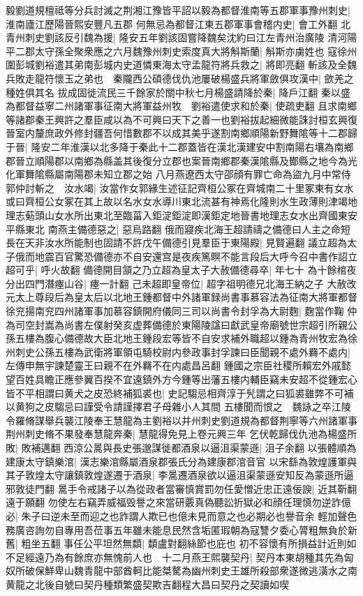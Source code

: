 毅劉道規檀祗等分兵討滅之荆湘江豫皆平詔以毅為都督淮南等五郡軍事豫州刺史|{
	淮南廬江歷陽晉熙安豐凡五郡}
何無忌為都督江東五郡軍事會稽内史|{
	會工外翻}
北青州刺史劉該反引魏為援|{
	隆安五年劉該固嘗降魏矣沈約曰江左青州治廣陵}
清河陽平二郡太守孫全聚衆應之六月魏豫州刺史索度真大將斛斯蘭|{
	斛斯亦虜姓也}
寇徐州圍彭城劉裕遣其弟南彭城内史道憐東海太守孟龍符將兵救之|{
	將即亮翻}
斬該及全魏兵敗走龍符懷玉之弟也　秦隴西公碩德伐仇池屢破楊盛兵將軍斂俱攻漢中|{
	歛羌之種姓俱其名}
拔成固徙流民三千餘家於關中秋七月楊盛請降於秦|{
	降戶江翻}
秦以盛為都督益寧二州諸軍事征南大將軍益州牧　劉裕遣使求和於秦|{
	使疏吏翻}
且求南鄉等諸郡秦王興許之羣臣咸以為不可興曰天下之善一也劉裕拔起細微能誅討桓玄興復晉室内釐庶政外修封疆吾何惜數郡不以成其美乎遂割南鄉順陽新野舞隂等十二郡歸于晉|{
	隆安二年淮漢以北多降于秦此十二郡蓋皆在漢北漢建安中割南陽右壤為南鄉郡晉立順陽郡以南鄉為縣盖其後復分立郡也案晉南鄉郡秦漢隂縣及鄼縣之地今為光化軍舞隂縣屬南陽郡未知立郡之始}
八月燕遼西太守邵顔有罪亡命為盜九月中常侍郭仲討斬之　汝水竭|{
	汝當作女郭緣生述征記齊桓公冢在齊城南二十里冢東有女水或曰齊桓公女冢在其上故以名水女水導川東北流甚有神焉化隆則水生政薄則津竭地理志葂頭山女水所出東北至臨菑入鉅淀鉅淀即漢鉅定地晉書地理志女水出齊國東安平縣東北}
南燕主備德惡之|{
	惡烏路翻}
俄而寢疾北海王超請禱之備德曰人主之命短長在天非汝水所能制也固請不許戊午備德引見羣臣于東陽殿|{
	見賢遍翻}
議立超為太子俄而地震百官驚恐備德亦不自安還宫是夜疾篤瞑不能言段后大呼今召中書作詔立超可乎|{
	呼火故翻}
備德開目頷之乃立超為皇太子大赦備德尋卒|{
	年七十}
為十餘棺夜分出四門潛瘞山谷|{
	瘞一計翻}
己未超即皇帝位|{
	超字祖明德兄北海王納之子}
大赦改元太上尊段后為皇太后以北地王鍾都督中外諸軍録尚書事慕容法為征南大將軍都督徐兖揚南兖四州諸軍事加慕容鎮開府儀同三司以尚書令封孚為大尉麴|{
	麴當作鞠}
仲為司空封嵩為尚書左僕射癸亥虚葬備德於東陽陵諡曰獻武皇帝廟號世宗超引所親公孫五樓為腹心備德故大臣北地王鍾段宏等皆不自安求補外職超以鍾為青州牧宏為徐州刺史公孫五樓為武衛將軍領屯騎校尉内參政事封孚諫曰臣聞親不處外羇不處内|{
	左傳申無宇諫楚靈王曰親不在外羇不在内處昌呂翻}
鍾國之宗臣社稷所賴宏外戚懿望百姓具瞻正應參翼百揆不宜遠鎮外方今鍾等出藩五樓内輔臣竊未安超不從鍾宏心皆不平相謂曰黄犬之皮恐終補狐裘也|{
	史記騶忌相齊淳于髠謂之曰狐裘雖弊不可補以黄狗之皮騶忌曰謹受令請謹擇君子母雜小人其間}
五樓聞而恨之　魏詠之卒江陵令羅脩謀舉兵襲江陵奉王慧龍為主劉裕以并州刺史劉道規為都督荆寧等六州諸軍事荆州刺史脩不果發奉慧龍奔秦|{
	慧龍得免見上卷元興三年}
乞伏乾歸伐仇池為楊盛所敗|{
	敗補邁翻}
西涼公暠與長史張邈謀徙都酒泉以逼沮渠蒙遜|{
	沮子余翻}
以張體順為建康太守鎮樂涫|{
	漢志樂涫縣屬酒泉郡張氏分為建康郡涫音官}
以宋繇為敦煌護軍與其子敦煌太守讓鎮敦煌遂遷于酒泉|{
	李暠遷酒泉欲以逼沮渠蒙遜安知反為蒙遜所逼邪敦徒門翻}
暠手令戒諸子以為從政者當審慎賞罰勿任愛憎近忠正遠佞諛|{
	近其靳翻遠于願翻}
勿使左右竊弄威福毁譽之來當研覈真偽聽訟折獄必和顔任理慎勿逆詐億必|{
	朱子曰逆未至而迎之也詐謂人欺已也億未見而意之也必期必也譽音余}
輕加聲色務廣咨詢勿自專用吾莅事五年雖未能息民然含垢匿瑕朝為寇讐夕委心膂粗無負於新舊|{
	粗坐五翻}
事任公平坦然無纇|{
	纇盧對翻絲節也庇也}
初不容懷有所損益計近則如不足經遠乃為有餘庶亦無愧前人也　十二月燕王熙襲契丹|{
	契丹本東胡種其先為匈奴所破保鮮卑山魏青龍中部酋軻比能桀驁為幽州刺史王雄所殺部衆遂微逃潢水之南黄龍之北後自號曰契丹種類繁盛契欺吉翻程大昌曰契丹之契讀如喫}


